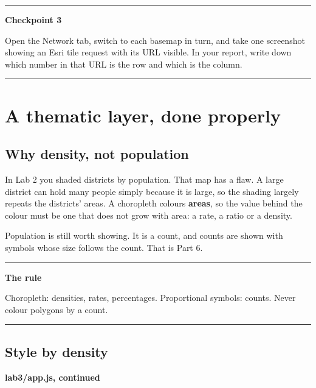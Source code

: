\documentclass{article}
\newcommand{\codecap}[1]{%
  \par\vspace{.9em}\noindent\textbf{#1}\par\vspace{-.6em}}
\newenvironment{keypoint}[1]
  {\par\vspace{.7em}\noindent\rule{\linewidth}{.6pt}\par\vspace{.15em}
   \noindent\textbf{#1}\par\nobreak\vspace{-.3em}}
  {\par\vspace{.15em}\noindent\rule{\linewidth}{.6pt}\par\vspace{.7em}}
\begin{document}
\begin{keypoint}{Checkpoint 3}
Open the Network tab, switch to each basemap in turn, and take one
screenshot showing an Esri tile request with its URL visible. In your
report, write down which number in that URL is the row and which is the
column.
\end{keypoint}


\section{A thematic layer, done properly}

\subsection{Why density, not population}

In Lab 2 you shaded districts by population. That map has a flaw. A
large district can hold many people simply because it is large, so the
shading largely repeats the districts' areas. A choropleth colours
\textbf{areas}, so the value behind the colour must be one that does not
grow with area: a rate, a ratio or a density.

Population is still worth showing. It is a count, and counts are shown
with symbols whose size follows the count. That is Part 6.

\begin{keypoint}{The rule}
Choropleth: densities, rates, percentages. Proportional symbols:
counts. Never colour polygons by a count.
\end{keypoint}

\subsection{Style by density}

\codecap{lab3/app.js, continued}
\end{document}
